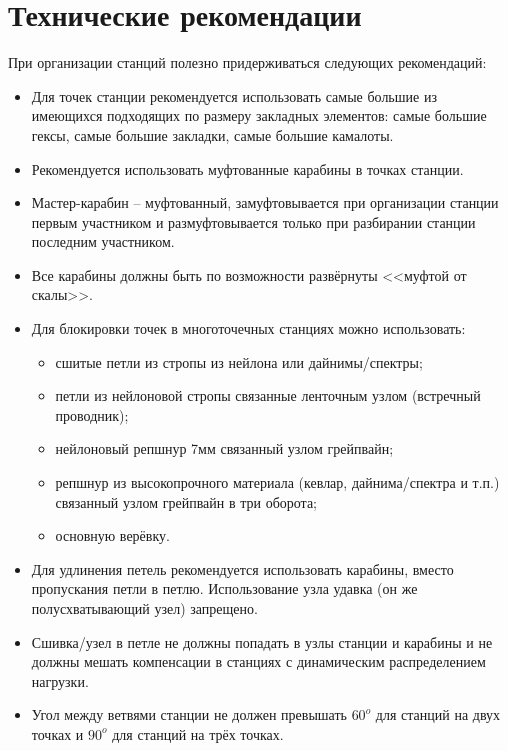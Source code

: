 \documentclass[fleqn, 12pt]{extarticle}
\begin{document}
\section{Технические рекомендации}\label{sec:advice}
    При организации станций полезно придерживаться следующих рекомендаций:
    \begin{itemize}
        \item Для точек станции рекомендуется использовать самые большие из имеющихся подходящих по размеру закладных элементов:
              самые большие гексы, самые большие закладки, самые большие камалоты.
        \item Рекомендуется использовать муфтованные карабины в точках станции.
        \item Мастер-карабин -- муфтованный, замуфтовывается при организации станции первым участником и размуфтовывается только при разбирании станции последним участником.
        \item Все карабины должны быть по возможности развёрнуты <<муфтой от скалы>>.
        \item Для блокировки точек в многоточечных станциях можно использовать:
            \begin{itemize}
                \item сшитые петли из стропы из нейлона или дайнимы/спектры;
                \item петли из нейлоновой стропы связанные ленточным узлом (встречный проводник);
                \item нейлоновый репшнур 7мм связанный узлом грейпвайн;
                \item репшнур из высокопрочного материала (кевлар, дайнима/спектра и т.п.) связанный узлом грейпвайн в три оборота;
                \item основную верёвку.
            \end{itemize}
        \item Для удлинения петель рекомендуется использовать карабины, вместо пропускания петли в петлю. Использование узла удавка (он же полусхватывающий узел) запрещено.
        \item Сшивка/узел в петле не должны попадать в узлы станции и карабины и не должны мешать компенсации в станциях с динамическим распределением нагрузки.
        \item Угол между ветвями станции не должен превышать $60^o$ для станций на двух точках и $90^o$ для станций на трёх точках.
    \end{itemize}
    
\nocite{*}


\end{document}
